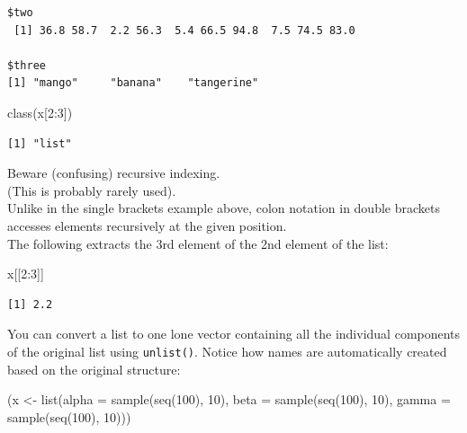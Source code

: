 \documentclass[
]{book}
\newenvironment{Shaded}{\begin{snugshade}}{\end{snugshade}}
\newcommand{\AttributeTok}[1]{\textcolor[rgb]{0.77,0.63,0.00}{#1}}
\newcommand{\DecValTok}[1]{\textcolor[rgb]{0.00,0.00,0.81}{#1}}
\newcommand{\FunctionTok}[1]{\textcolor[rgb]{0.00,0.00,0.00}{#1}}
\newcommand{\NormalTok}[1]{#1}
\newcommand{\OtherTok}[1]{\textcolor[rgb]{0.56,0.35,0.01}{#1}}
\newcommand{\SpecialCharTok}[1]{\textcolor[rgb]{0.00,0.00,0.00}{#1}}
\begin{document}
\begin{verbatim}
$two
 [1] 36.8 58.7  2.2 56.3  5.4 66.5 94.8  7.5 74.5 83.0

$three
[1] "mango"     "banana"    "tangerine"
\end{verbatim}

\begin{Shaded}
\begin{Highlighting}[]
\FunctionTok{class}\NormalTok{(x[}\DecValTok{2}\SpecialCharTok{:}\DecValTok{3}\NormalTok{])}
\end{Highlighting}
\end{Shaded}

\begin{verbatim}
[1] "list"
\end{verbatim}

Beware (confusing) recursive indexing.\\
(This is probably rarely used).\\
Unlike in the single brackets example above, colon notation in double brackets accesses elements recursively at the given position.\\
The following extracts the 3rd element of the 2nd element of the list:

\begin{Shaded}
\begin{Highlighting}[]
\NormalTok{x[[}\DecValTok{2}\SpecialCharTok{:}\DecValTok{3}\NormalTok{]]}
\end{Highlighting}
\end{Shaded}

\begin{verbatim}
[1] 2.2
\end{verbatim}

You can convert a list to one lone vector containing all the individual components of the original list using \texttt{unlist()}. Notice how names are automatically created based on the original structure:

\begin{Shaded}
\begin{Highlighting}[]
\NormalTok{(x }\OtherTok{\textless{}{-}} \FunctionTok{list}\NormalTok{(}\AttributeTok{alpha =} \FunctionTok{sample}\NormalTok{(}\FunctionTok{seq}\NormalTok{(}\DecValTok{100}\NormalTok{), }\DecValTok{10}\NormalTok{),}
          \AttributeTok{beta =} \FunctionTok{sample}\NormalTok{(}\FunctionTok{seq}\NormalTok{(}\DecValTok{100}\NormalTok{), }\DecValTok{10}\NormalTok{),}
          \AttributeTok{gamma =} \FunctionTok{sample}\NormalTok{(}\FunctionTok{seq}\NormalTok{(}\DecValTok{100}\NormalTok{), }\DecValTok{10}\NormalTok{)))}
\end{Highlighting}
\end{Shaded}
\end{document}
